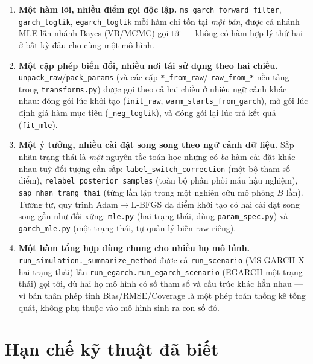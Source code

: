 \documentclass[11pt,a4paper]{article}
\newcommand{\code}[1]{\texttt{#1}}
\newcommand{\file}[1]{\texttt{#1}}
\begin{document}
\begin{enumerate}
  \item \textbf{Một hàm lõi, nhiều điểm gọi độc lập.} \code{ms\_garch\_forward\_filter},
    \code{garch\_loglik}, \code{egarch\_loglik} mỗi hàm chỉ tồn tại \emph{một bản},
    được cả nhánh MLE lẫn nhánh Bayes (VB/MCMC) gọi tới --- không có hàm hợp lý thứ
    hai ở bất kỳ đâu cho cùng một mô hình.
  \item \textbf{Một cặp phép biến đổi, nhiều nơi tái sử dụng theo hai chiều.}
    \code{unpack\_raw}/\code{pack\_params} (và các cặp \code{*\_from\_raw}/
    \code{raw\_from\_*} nền tảng trong \file{transforms.py}) được gọi theo cả hai
    chiều ở nhiều ngữ cảnh khác nhau: đóng gói lúc khởi tạo (\code{init\_raw},
    \code{warm\_starts\_from\_garch}), mở gói lúc định giá hàm mục tiêu
    (\code{\_neg\_loglik}), và đóng gói lại lúc trả kết quả (\code{fit\_mle}).
  \item \textbf{Một ý tưởng, nhiều cài đặt song song theo ngữ cảnh dữ liệu.} Sắp nhãn
    trạng thái là \emph{một} nguyên tắc toán học nhưng có \emph{ba} hàm cài đặt khác
    nhau tuỳ đối tượng cần sắp: \code{label\_switch\_correction} (một bộ tham số
    điểm), \code{relabel\_posterior\_samples} (toàn bộ phân phối mẫu hậu nghiệm),
    \code{sap\_nhan\_trang\_thai} (từng lần lặp trong một nghiên cứu mô phỏng $B$
    lần). Tương tự, quy trình Adam$\to$L-BFGS đa điểm khởi tạo có hai cài đặt song
    song gần như đối xứng: \code{mle.py} (hai trạng thái, dùng \file{param\_spec.py})
    và \code{garch\_mle.py} (một trạng thái, tự quản lý biến raw riêng).
  \item \textbf{Một hàm tổng hợp dùng chung cho nhiều họ mô hình.}
    \code{run\_simulation.\_summarize\_method} được cả \code{run\_scenario} (MS-GARCH-X
    hai trạng thái) lẫn \code{run\_egarch.run\_egarch\_scenario} (EGARCH một trạng
    thái) gọi tới, dù hai họ mô hình có số tham số và cấu trúc khác hẳn nhau --- vì
    bản thân phép tính Bias/RMSE/Coverage là một phép toán thống kê tổng quát, không
    phụ thuộc vào mô hình sinh ra con số đó.
\end{enumerate}

\section{Hạn chế kỹ thuật đã biết}
\label{sec:limitations}
\end{document}
